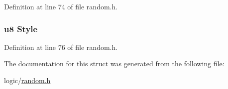 \-Definition at line 74 of file random.\-h.

\hypertarget{structrandom_a0adf1bc45ebd31c75e1569a65ae60db4}{
\subsubsection[{\-Style}]{\setlength{\rightskip}{0pt plus 5cm}u8 {\bf \-Style}}}\label{structrandom_a0adf1bc45ebd31c75e1569a65ae60db4}


\-Definition at line 76 of file random.\-h.



\-The documentation for this struct was generated from the following file\-:\begin{DoxyCompactItemize}
\item 
logic/\hyperlink{random_8h}{random.\-h}\end{DoxyCompactItemize}
